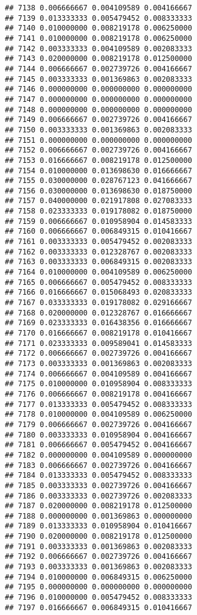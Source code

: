 \documentclass[
]{article}
\begin{document}
\begin{verbatim}
## 7138 0.006666667 0.004109589 0.004166667
## 7139 0.013333333 0.005479452 0.008333333
## 7140 0.010000000 0.008219178 0.006250000
## 7141 0.010000000 0.008219178 0.006250000
## 7142 0.003333333 0.004109589 0.002083333
## 7143 0.020000000 0.008219178 0.012500000
## 7144 0.006666667 0.002739726 0.004166667
## 7145 0.003333333 0.001369863 0.002083333
## 7146 0.000000000 0.000000000 0.000000000
## 7147 0.000000000 0.000000000 0.000000000
## 7148 0.000000000 0.000000000 0.000000000
## 7149 0.006666667 0.002739726 0.004166667
## 7150 0.003333333 0.001369863 0.002083333
## 7151 0.000000000 0.000000000 0.000000000
## 7152 0.006666667 0.002739726 0.004166667
## 7153 0.016666667 0.008219178 0.012500000
## 7154 0.010000000 0.013698630 0.016666667
## 7155 0.030000000 0.028767123 0.041666667
## 7156 0.030000000 0.013698630 0.018750000
## 7157 0.040000000 0.021917808 0.027083333
## 7158 0.023333333 0.019178082 0.018750000
## 7159 0.006666667 0.010958904 0.014583333
## 7160 0.006666667 0.006849315 0.010416667
## 7161 0.003333333 0.005479452 0.002083333
## 7162 0.003333333 0.012328767 0.002083333
## 7163 0.003333333 0.006849315 0.002083333
## 7164 0.010000000 0.004109589 0.006250000
## 7165 0.006666667 0.005479452 0.008333333
## 7166 0.016666667 0.015068493 0.020833333
## 7167 0.033333333 0.019178082 0.029166667
## 7168 0.020000000 0.012328767 0.016666667
## 7169 0.023333333 0.016438356 0.016666667
## 7170 0.016666667 0.008219178 0.010416667
## 7171 0.023333333 0.009589041 0.014583333
## 7172 0.006666667 0.002739726 0.004166667
## 7173 0.003333333 0.001369863 0.002083333
## 7174 0.006666667 0.004109589 0.004166667
## 7175 0.010000000 0.010958904 0.008333333
## 7176 0.006666667 0.008219178 0.004166667
## 7177 0.013333333 0.005479452 0.008333333
## 7178 0.010000000 0.004109589 0.006250000
## 7179 0.006666667 0.002739726 0.004166667
## 7180 0.003333333 0.010958904 0.004166667
## 7181 0.006666667 0.005479452 0.004166667
## 7182 0.000000000 0.004109589 0.000000000
## 7183 0.006666667 0.002739726 0.004166667
## 7184 0.013333333 0.005479452 0.008333333
## 7185 0.003333333 0.002739726 0.004166667
## 7186 0.003333333 0.002739726 0.002083333
## 7187 0.020000000 0.008219178 0.012500000
## 7188 0.000000000 0.001369863 0.000000000
## 7189 0.013333333 0.010958904 0.010416667
## 7190 0.020000000 0.008219178 0.012500000
## 7191 0.003333333 0.001369863 0.002083333
## 7192 0.006666667 0.002739726 0.004166667
## 7193 0.003333333 0.001369863 0.002083333
## 7194 0.010000000 0.006849315 0.006250000
## 7195 0.000000000 0.000000000 0.000000000
## 7196 0.010000000 0.005479452 0.008333333
## 7197 0.016666667 0.006849315 0.010416667

\end{verbatim}
\end{document}
